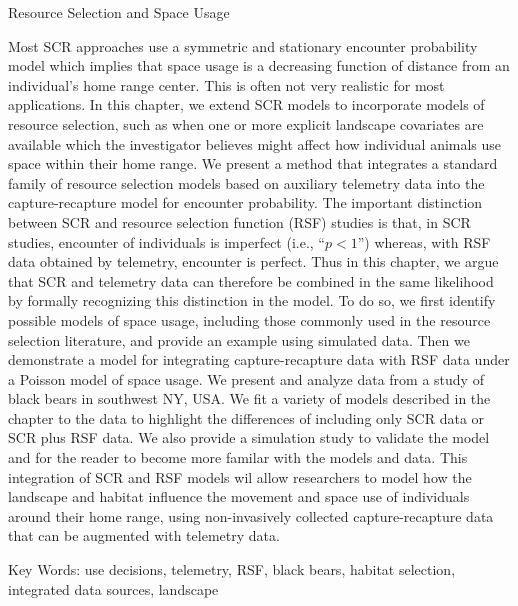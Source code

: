 Resource Selection and Space Usage


Most SCR approaches use a symmetric and stationary encounter probability 
model which implies that space usage is a decreasing function of distance
from an individual's home range center.  This is often not very realistic for most
applications.  In this chapter, we extend SCR models to
incorporate models of resource selection, such as when one or more
explicit landscape covariates are available which the investigator
believes might affect how individual animals use space within their
home range.  We present a method that integrates a
standard family of resource selection models based on auxiliary
telemetry data into the capture-recapture model for encounter
probability.   The important distinction between SCR and resource
selection function (RSF)
studies is that, in SCR studies, encounter of individuals is imperfect
(i.e., ``$p<1$'') whereas, with RSF data obtained by telemetry,
encounter is perfect.  Thus in this chapter, we argue that SCR and telemetry data 
can therefore be combined in the same likelihood by formally
recognizing this distinction in the model.  To do so, we first identify possible
models of space usage, including those commonly used in the resource
selection literature, and provide an example using simulated data.  Then we
demonstrate a model for integrating capture-recapture data with RSF data under
a Poisson model of space usage.  We present and analyze
data from a study of black bears in southwest NY, USA.  We fit a variety of models described
in the chapter to the data to highlight the differences of including only SCR data or SCR plus RSF
 data.  We also provide a simulation study to validate the model and for the reader to become
more familar with the models and data. 
This integration of SCR and RSF models wil allow researchers to model how the
landscape and habitat influence the movement and space use of
individuals around their home range, using non-invasively collected
capture-recapture data that can be augmented with telemetry data.

Key Words:  use decisions, telemetry, RSF, black bears, habitat selection, integrated data sources,
landscape